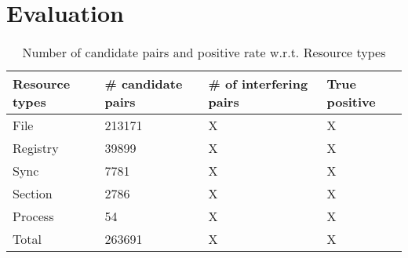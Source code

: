 \chapter{Evaluation}
\label{chapter:evaluation}
\begin{table}[htsb]
  \caption[Number of candidate pairs and positive rate w.r.t. Resource types]{Number of candidate pairs and positive rate w.r.t. Resource types}\label{tab:routers}
  \centering
  \begin{tabular}{l l l l}
    \toprule
    Resource types & \# candidate pairs& \# of interfering pairs & True positive \\
    \midrule
    File & 213171 & X & X \\
    Registry & 39899 & X & X \\
    Sync & 7781 & X & X \\
    Section & 2786 & X & X \\
    Process & 54 & X & X \\
    \bottomrule
    Total & 263691 & X & X \\
  \end{tabular}
\end{table}

